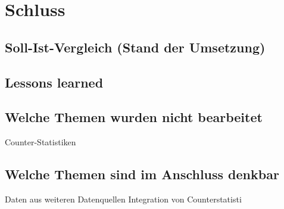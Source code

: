 
\chapter{Schluss}
\label{chap:six}
\section{Soll-Ist-Vergleich (Stand der Umsetzung)}
\section{Lessons learned}
\section{Welche Themen wurden nicht bearbeitet}
Counter-Statistiken

\section{Welche Themen sind im Anschluss denkbar}
Daten aus weiteren Datenquellen
Integration von Counterstatisti
